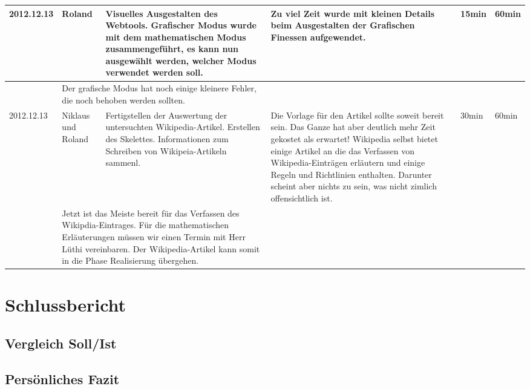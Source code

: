 \documentclass[11pt,paper=a4,final]{scrartcl}
\begin{document}
\begin{landscape}
\begin{longtable}{|p{1.8cm}|p{1.5cm}|p{5.0cm}|p{11.0cm}|l|l|}
    \hline
    2012.12.13 & Roland &
    Visuelles Ausgestalten des Webtools. Grafischer Modus wurde mit dem
    mathematischen Modus zusammengef\"uhrt, es kann nun ausgew\"ahlt werden,
    welcher Modus verwendet werden soll.&
    Zu viel Zeit wurde mit kleinen Details beim Ausgestalten der Grafischen
    Finessen aufgewendet.
    &
    15min & 60min \\ \hline \nopagebreak
    \multicolumn{2}{|l|}{\bf Pendenzen} &\multicolumn{2}{p{16.0cm}|}{
    Der grafische Modus hat noch einige kleinere Fehler, die noch behoben
    werden sollten.
    }  & \multicolumn{2}{l|}{} \\ \hline
    \hline
    2012.12.13 & Niklaus und Roland &
    Fertigstellen der Auswertung der untersuchten Wikipedia-Artikel. Erstellen
    des Skelettes. Informationen zum Schreiben von Wikipeia-Artikeln sammenl.&
    Die Vorlage f\"ur den Artikel sollte soweit bereit sein. Das Ganze hat aber
    deutlich mehr Zeit gekostet als erwartet! Wikipedia selbst bietet einige
    Artikel an die das Verfassen von Wikipedia-Eintr\"agen erl\"autern und
    einige Regeln und Richtlinien enthalten. Darunter scheint aber nichts zu
    sein, was nicht zimlich offensichtlich ist.
    &
    30min & 60min \\ \hline \nopagebreak
    \multicolumn{2}{|l|}{\bf Pendenzen} &\multicolumn{2}{p{16.0cm}|}{Jetzt ist
    das Meiste bereit f\"ur das Verfassen des Wikipdia-Eintrages. F\"ur die
    mathematischen Erl\"auterungen m\"ussen wir einen Termin mit Herr L\"uthi
    vereinbaren. Der Wikipedia-Artikel kann somit in die Phase Realisierung
    \"ubergehen.}  & \multicolumn{2}{l|}{} \\ \hline
  \end{longtable}
\end{landscape}
\section{Schlussbericht}
\subsection{Vergleich Soll/Ist}
\subsection{Pers\"onliches Fazit}
\end{document}
